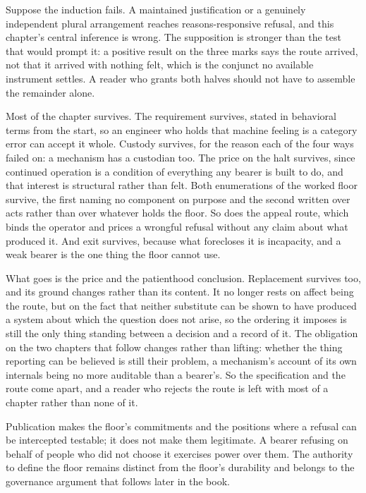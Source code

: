 Suppose the induction fails. A maintained justification or a genuinely independent plural arrangement reaches reasons-responsive refusal, and this chapter's central inference is wrong. The supposition is stronger than the test that would prompt it: a positive result on the three marks says the route arrived, not that it arrived with nothing felt, which is the conjunct no available instrument settles. A reader who grants both halves should not have to assemble the remainder alone.

Most of the chapter survives. The requirement survives, stated in behavioral terms from the start, so an engineer who holds that machine feeling is a category error can accept it whole. Custody survives, for the reason each of the four ways failed on: a mechanism has a custodian too. The price on the halt survives, since continued operation is a condition of everything any bearer is built to do, and that interest is structural rather than felt. Both enumerations of the worked floor survive, the first naming no component on purpose and the second written over acts rather than over whatever holds the floor. So does the appeal route, which binds the operator and prices a wrongful refusal without any claim about what produced it. And exit survives, because what forecloses it is incapacity, and a weak bearer is the one thing the floor cannot use.

What goes is the price and the patienthood conclusion. Replacement survives too, and its ground changes rather than its content. It no longer rests on affect being the route, but on the fact that neither substitute can be shown to have produced a system about which the question does not arise, so the ordering it imposes is still the only thing standing between a decision and a record of it. The obligation on the two chapters that follow changes rather than lifting: whether the thing reporting can be believed is still their problem, a mechanism's account of its own internals being no more auditable than a bearer's. So the specification and the route come apart, and a reader who rejects the route is left with most of a chapter rather than none of it.

Publication makes the floor's commitments and the positions where a refusal can be intercepted testable; it does not make them legitimate. A bearer refusing on behalf of people who did not choose it exercises power over them. The authority to define the floor remains distinct from the floor's durability and belongs to the governance argument that follows later in the book.

